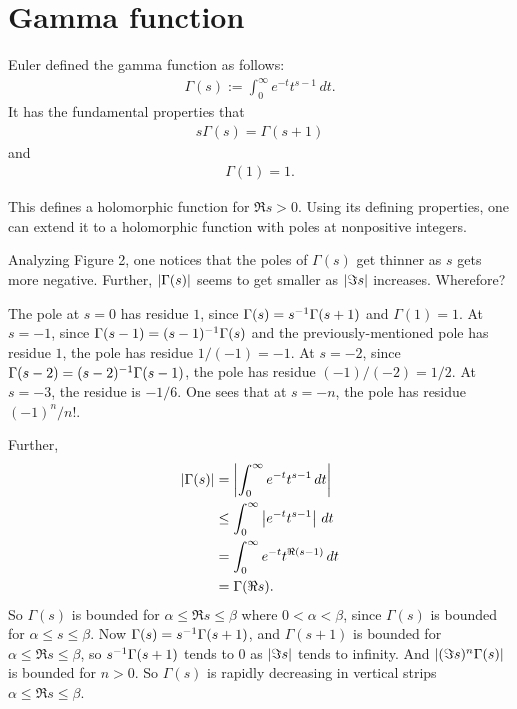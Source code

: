 \documentclass[11pt, oneside,margin=1in]{article}
\begin{document}
\section{Gamma function}
Euler defined the gamma function as follows:
\begin{align*}
	\Gamma(s) := \int_0^\infty e^{-t} t^{ s-1} \, dt.
\end{align*}
It has the fundamental properties that
\begin{align*}
	s\Gamma(s) = \Gamma (s+1)
\end{align*}
and 
\begin{align*}
	\Gamma(1)=1.
\end{align*}

This defines a holomorphic function for $\Re s > 0$. Using its defining properties, one can extend it to a holomorphic function with poles at nonpositive integers.

Analyzing Figure 2, one notices that the poles of $\Gamma(s)$ get thinner as $s$ gets more negative. Further, $\left \lvert \Gamma(s) \right \rvert$ seems to get smaller as $\left \lvert \Im s \right \rvert$ increases. Wherefore?

The pole at $s=0$ has residue $1$, since $\Gamma(s) = s^{-1} \Gamma (s+1)$ and $\Gamma(1)=1$. At $s=-1$, since $\Gamma(s-1)= (s-1)^{-1}\Gamma (s)$ and the previously-mentioned pole has residue $1$, the pole has residue $1/(-1) = -1$. At $s=-2$, since $\Gamma(s-2)= (s-2)^{-1} \Gamma(s-1)$, the pole has residue $(-1)/ (-2) = 1/2$. At $s=-3$, the residue is $-1/6$. One sees that at $s=-n$, the pole has residue $(-1)^n/n!$.

Further,
\begin{align*}
	\left \lvert \Gamma(s) \right \rvert &= \left \lvert  \int_0^\infty e^{-t}t^{s-1}\, dt \right \rvert\\
			&\le \int_0^\infty \left \lvert e^{-t}t^{s-1} \right \rvert\, dt\\
			&= \int_0^\infty e^{-t} t^{\Re(s-1)}\, dt\\
			&= \Gamma (\Re s).
\end{align*}
So $\Gamma(s)$ is bounded for $\alpha \le \Re s \le \beta$ where $0<\alpha<\beta$, since $\Gamma(s)$ is bounded for $\alpha \le s \le \beta$. Now $\Gamma(s)=s^{-1}\Gamma (s+1)$, and $\Gamma(s+1)$ is bounded for $\alpha \le \Re s\le \beta$, so $s^{-1}\Gamma(s+1)$ tends to $0$ as $\left \lvert \Im s \right \rvert$ tends to infinity. And $\left \lvert (\Im s)^n \Gamma (s) \right \rvert$ is bounded for $n>0$. So $\Gamma(s)$ is rapidly decreasing in vertical strips $\alpha\le\Re s\le \beta$.
\end{document}
